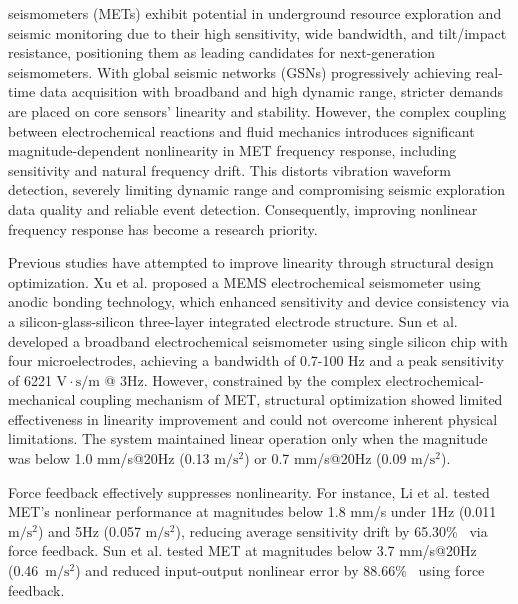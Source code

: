 \documentclass[journal]{IEEEtran}
\newcommand{\valSensitivityDriftSuppressionLI}{65.30\%}
\newcommand{\valNonlinearSuppressionSUN}{88.66\%}
\begin{document}
 seismometers (METs) exhibit potential in underground resource exploration and seismic monitoring due to their high sensitivity, wide bandwidth, and tilt/impact resistance, positioning them as leading candidates for next-generation seismometers\cite{10841463}. With global seismic networks (GSNs) progressively achieving real-time data acquisition with broadband and high dynamic range\cite{WOS:000853457100001}, stricter demands are placed on core sensors' linearity and stability. However, the complex coupling between electrochemical reactions and fluid mechanics introduces significant magnitude-dependent nonlinearity in MET frequency response, including sensitivity and natural frequency drift. This distorts vibration waveform detection, severely limiting dynamic range and compromising seismic exploration data quality and reliable event detection. Consequently, improving nonlinear frequency response has become a research priority.

Previous studies have attempted to improve linearity through structural design optimization. Xu et al. \cite{9481294} proposed a MEMS electrochemical seismometer using anodic bonding technology, which enhanced sensitivity and device consistency via a silicon-glass-silicon three-layer integrated electrode structure. Sun et al. \cite{WOS:001445070100008} developed a broadband electrochemical seismometer using single silicon chip with four microelectrodes, achieving a bandwidth of 0.7-100 Hz and a peak sensitivity of 6221 $\text{V} \cdot \text{s} / \text{m}$ @ 3Hz. 
However, constrained by the complex electrochemical-mechanical coupling mechanism of MET, structural optimization showed limited effectiveness in linearity improvement and could not overcome inherent physical limitations. The system maintained linear operation only when the magnitude was below 1.0 mm/s@20Hz (0.13 $\text{m}/\text{s}^2$)\cite{9481294} or 0.7 mm/s@20Hz (0.09 $\text{m}/\text{s}^2$)\cite{WOS:001445070100008}. 

Force feedback effectively suppresses nonlinearity. For instance, Li et al. \cite{li_electrochemical_2017} tested MET's nonlinear performance at magnitudes below 1.8 mm/s under 1Hz (0.011$\text{m}/\text{s}^2$) and 5Hz (0.057 $\text{m}/\text{s}^2$), reducing average sensitivity drift by \valSensitivityDriftSuppressionLI~ via force feedback. Sun et al. \cite{WOS:000408118700046} tested MET at magnitudes below 3.7 mm/s@20Hz (0.46~$\text{m}/\text{s}^2$) and reduced input-output nonlinear error by \valNonlinearSuppressionSUN~ using force feedback. 
\end{document}

